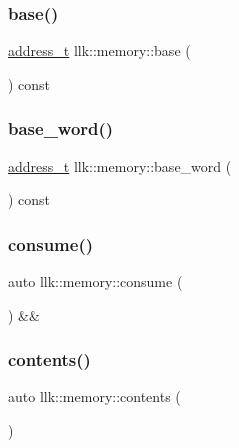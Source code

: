\subsubsection{\texorpdfstring{base()}{base()}}
{\footnotesize\ttfamily \hyperlink{classllk_1_1memory_ae7a4b897aa999f22e250dc8e4d773dec}{address\+\_\+t} llk\+::memory\+::base (\begin{DoxyParamCaption}{ }\end{DoxyParamCaption}) const\hspace{0.3cm}{\ttfamily [inline]}}

\mbox{\label{classllk_1_1memory_aa87483dcd1f592e288a4191e435d2ad3}} 
\subsubsection{\texorpdfstring{base\+\_\+word()}{base\_word()}}
{\footnotesize\ttfamily \hyperlink{classllk_1_1memory_ae7a4b897aa999f22e250dc8e4d773dec}{address\+\_\+t} llk\+::memory\+::base\+\_\+word (\begin{DoxyParamCaption}{ }\end{DoxyParamCaption}) const\hspace{0.3cm}{\ttfamily [inline]}}

\mbox{\label{classllk_1_1memory_aebeb9c5ccea123bc09ecd2667756af91}} 
\subsubsection{\texorpdfstring{consume()}{consume()}}
{\footnotesize\ttfamily auto llk\+::memory\+::consume (\begin{DoxyParamCaption}{ }\end{DoxyParamCaption}) \&\&\hspace{0.3cm}{\ttfamily [inline]}}

\mbox{\label{classllk_1_1memory_abdb3f8fa8d0c1b700dfb02d616b02bd2}} 
\subsubsection{\texorpdfstring{contents()}{contents()}}
{\footnotesize\ttfamily auto llk\+::memory\+::contents (\begin{DoxyParamCaption}{ }\end{DoxyParamCaption})\hspace{0.3cm}{\ttfamily [inline]}}

